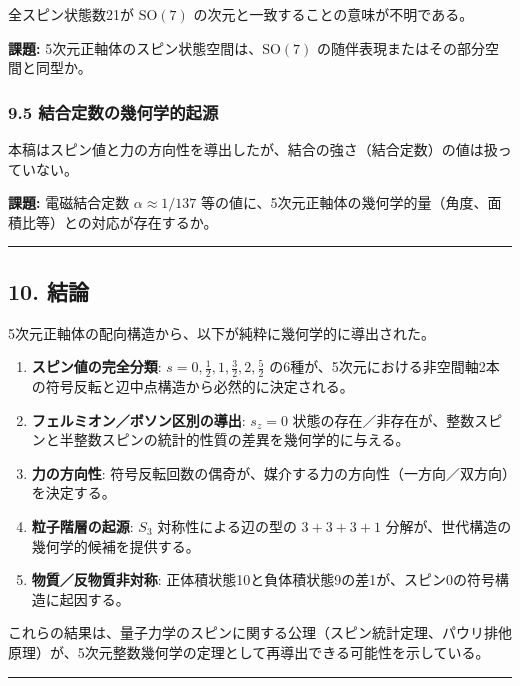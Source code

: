 \documentclass[a4paper,11pt]{ltjsarticle}
\providecommand{\tightlist}{\setlength{\itemsep}{0pt}\setlength{\parskip}{0pt}}
\begin{document}
全スピン状態数21が $\mathrm{SO}(7)$
の次元と一致することの意味が不明である。

\textbf{課題:} 5次元正軸体のスピン状態空間は、$\mathrm{SO}(7)$
の随伴表現またはその部分空間と同型か。

\subsubsection*{9.5 結合定数の幾何学的起源}

本稿はスピン値と力の方向性を導出したが、結合の強さ（結合定数）の値は扱っていない。

\textbf{課題:} 電磁結合定数 $\alpha \approx 1/137$
等の値に、5次元正軸体の幾何学的量（角度、面積比等）との対応が存在するか。

\begin{center}\rule{0.5\linewidth}{0.5pt}\end{center}

\subsection*{10. 結論}

5次元正軸体の配向構造から、以下が純粋に幾何学的に導出された。

\begin{enumerate}
\def\labelenumi{\arabic{enumi}.}
\tightlist
\item
  \textbf{スピン値の完全分類}:
  $s = 0, \frac{1}{2}, 1, \frac{3}{2}, 2, \frac{5}{2}$
  の6種が、5次元における非空間軸2本の符号反転と辺中点構造から必然的に決定される。
\item
  \textbf{フェルミオン／ボソン区別の導出}: $s_z = 0$
  状態の存在／非存在が、整数スピンと半整数スピンの統計的性質の差異を幾何学的に与える。
\item
  \textbf{力の方向性}:
  符号反転回数の偶奇が、媒介する力の方向性（一方向／双方向）を決定する。
\item
  \textbf{粒子階層の起源}: $S_3$ 対称性による辺の型の
  $3 + 3 + 3 + 1$ 分解が、世代構造の幾何学的候補を提供する。
\item
  \textbf{物質／反物質非対称}:
  正体積状態10と負体積状態9の差1が、スピン0の符号構造に起因する。
\end{enumerate}

これらの結果は、量子力学のスピンに関する公理（スピン統計定理、パウリ排他原理）が、5次元整数幾何学の定理として再導出できる可能性を示している。

\begin{center}\rule{0.5\linewidth}{0.5pt}\end{center}
\end{document}
